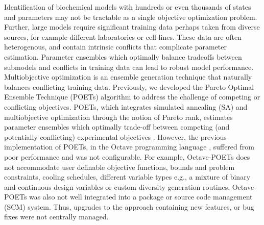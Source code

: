 \documentclass[12pt]{article}
\begin{document}
Identification of biochemical models with hundreds or even thousands of states and parameters may not be tractable as a single objective optimization problem.
Further, large models require significant training data perhaps taken from diverse sources, for example different laboratories or cell-lines.
These data are often heterogenous, and contain intrinsic conflicts that complicate parameter estimation.
Parameter ensembles which optimally balance tradeoffs between submodels and conflicts in training data can
lead to robust model performance. Multiobjective optimization is an ensemble generation technique that naturally balances conflicting training data.
Previously, we developed the Pareto Optimal Ensemble Technique (POETs) algorithm to address the challenge of competing or conflicting objectives.
POETs, which integrates simulated annealing (SA) and multiobjective optimization through the notion of Pareto rank, estimates parameter ensembles which optimally trade-off between
competing (and potentially conflicting) experimental objectives \cite{Song:2010aa}.
However, the previous implementation of POETs, in the Octave programming language \cite{CITE_Octave}, suffered from poor performance and was not configurable.
For example, Octave-POETs does not accommodate user definable objective functions, bounds and problem constraints, cooling schedules, different variable types e.g., a mixture of binary and continuous design variables or custom diversity generation routines. Octave-POETs was also not well integrated into a package or
source code management (SCM) system. Thus, upgrades to the approach containing new features, or bug fixes were not centrally managed.

\clearpage
\end{document}
